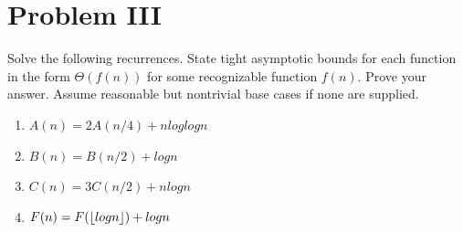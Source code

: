 \section{Problem III}
 Solve the following recurrences. State tight asymptotic bounds for each function in the form $\Theta(f(n))$ for some recognizable function $f(n)$. Prove your answer. Assume reasonable but nontrivial base cases if none are supplied.

\begin{enumerate}[label=(\alph*)]
	\item $A(n)=2A(n/4)+nloglogn$
	\item $B(n) = B(n/2) + log n$
	\item $C(n)=3C(n/2)+nlogn$
	\item $F(n)=F(\floor*{logn})+logn$
\end{enumerate}

